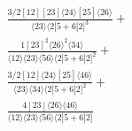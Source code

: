 \documentclass[varwidth, border=5pt]{standalone}
\begin{document}
\begin{my}
$\begin{gathered}
\scriptscriptstyle\frac{3/2[12][23]⟨24⟩[25]⟨26⟩}{⟨23⟩⟨2|5+6|2]^3}+\\
\scriptscriptstyle\frac{1[23]^2⟨26⟩^2⟨34⟩}{⟨12⟩⟨23⟩⟨56⟩⟨2|5+6|2]^2}+\\
\scriptscriptstyle\frac{3/2[12]⟨24⟩[25]⟨46⟩}{⟨23⟩⟨34⟩⟨2|5+6|2]^2}+\\
\scriptscriptstyle\frac{4[23]⟨26⟩⟨46⟩}{⟨12⟩⟨23⟩⟨56⟩⟨2|5+6|2]}\phantom{+}
\end{gathered}$
\end{my}
\end{document}

